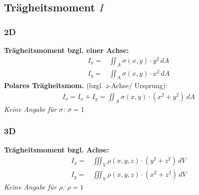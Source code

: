 \subsection{Trägheitsmoment \hfill $I$}
    \subsubsection{2D}
        \textbf{Trägheitsmoment bzgl. einer Achse:}
        \begin{align*}
            I_x =& \iint_A \sigma(x,y) \cdot y^2 \, dA\\
            I_y =& \iint_A \sigma(x,y) \cdot x^2 \, dA
        \end{align*}
        \textbf{Polares Trägheitsmom.} (bzgl. $z$-Achse/ Ursprung):
        \begin{align*}
            I_o = I_x + I_y = \iint_A \sigma(x,y) \cdot (x^2 + y^2) \, dA 
        \end{align*}
        \textit{Keine Angabe für $\sigma$: $\sigma = 1$}

    \subsubsection{3D}
        \textbf{Trägheitsmoment bzgl. Achse:}
        \begin{align*}
            I_x =& \iiint_V \rho(x,y,z) \cdot (y^2 + z^2) \, dV\\
            I_y =& \iiint_V \rho(x,y,z) \cdot (x^2 + z^2) \, dV
        \end{align*}
        \textit{Keine Angabe für $\rho$: $\rho = 1$}
        

